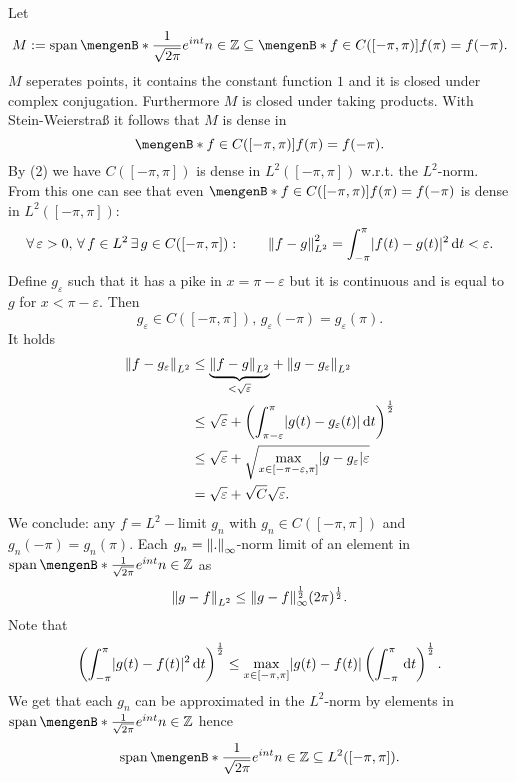 \begin{beweis}
	Let \[
		M := \spn\set[\frac{1}{\sqrt{2 \pi}}e^{int}]{n \in \mathbb{Z}} \subseteq \set[f \in C([-\pi, \pi])]{f( \pi) = f(-\pi)}.
	\]
	$M$ seperates points, it contains the constant function $1$ and it is closed under complex conjugation. Furthermore $M$ is closed under taking products. With Stein-Weierstraß it follows that $M$ is dense in 
	\[
		\set[f \in C([-\pi,\pi])]{f(\pi)= f(-\pi)}.
	\]
	By (2) we have $C([-\pi,\pi])$ is dense in $L^2([-\pi,\pi])$ w.r.t. the $L^2$-norm. From this one can see that even $\set[f \in C([-\pi,\pi])]{f(\pi)= f(-\pi)}$ is dense in $L^2([-\pi,\pi])$:
	\[
		\forall\,  \varepsilon>0, \,\forall\, f \in L^2 \,\exists\,g \in C([-\pi,\pi]): \qquad \norm{f-g}_{L^2}^2 = \int_{-\pi}^{\pi}\abs{f(t)-g(t)}^2 \,\mathrm{d}t < \varepsilon.
	\] 
	Define $g _{\varepsilon}$ such that it has a pike in $x = \pi - \varepsilon$ but it is continuous and is equal to $g$ for $x < \pi -\varepsilon$. Then
	\[
		g _{\varepsilon} \in C([-\pi,\pi]), \,g _{\varepsilon}(- \pi) = g _{\varepsilon} ( \pi).
	\]
	It holds
	\begin{align*}
		\norm{f - g _{\varepsilon}}_{L^2} &\leq \underset{< \sqrt{\varepsilon}}{\underbrace{\norm{f-g}_{L^2}}} + 
		\norm{g - g _{\varepsilon}}_{L^2} \\
		&\leq  \sqrt{\varepsilon} + \left( \int_{\pi - \varepsilon}^{\pi} \abs{g(t)-g _{\varepsilon}(t)} \,\mathrm{d}t  \right)^{\frac{1}{2}} \\
		&\leq \sqrt{\varepsilon} + \sqrt{\max_{x \in [-\pi - \varepsilon, \pi]} \abs{g- g _{\varepsilon}}\varepsilon} \\
		&= \sqrt{\varepsilon} + \sqrt{C} \sqrt{\varepsilon}.
	\end{align*}
	We conclude: any $f = L^2-$limit $g_n$ with $g_n \in C([-\pi,\pi])$ and $g_n(- \pi ) = g_n( \pi)$. Each $g_n = \norm{.}_\infty$-norm limit of an element in 
	$ \spn\set[\frac{1}{\sqrt{2 \pi}}e^{int}]{n \in \mathbb{Z}}$ as
	\[
		\norm{g-f}_{L^2} \leq \norm{g-f}^{\frac{1}{2}}_{\infty} (2 \pi)^{\frac{1}{2}}.
	\]
	Note that
	\[
		\left( \int_{- \pi}^{\pi} \lvert g(t)-f(t)\rvert^2 \,\mathrm{d}t \right)^{\frac{1}{2}} \leq \max_{x \in [ - \pi, \pi]} \lvert g(t)- f(t)\rvert \left( \int_{- \pi}^{\pi} \,\mathrm{d}t \right)^{\frac{1}{2}}.
	\]
	We get that each $g_n$ can be approximated in the $L^2$-norm by elements in $\spn\set[\frac{1}{\sqrt{2 \pi}}e^{int}]{n \in \mathbb{Z}}$ hence
	\[
		\spn\set[\frac{1}{\sqrt{2 \pi}}e^{int}]{n \in \mathbb{Z}} \subseteq L^2([- \pi,\pi]).
	\]
\end{beweis}


